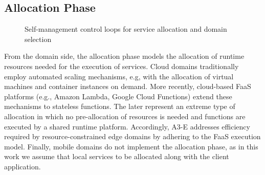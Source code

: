 \subsection{Allocation Phase}\label{sec:A3-E-allocation}

\begin{figure}[thbp]
	\centering
	\captionsetup[subfigure]{width=0.4\textwidth}	
	\null\hfill
	\captionsetup[subfigure]{width=0.4\textwidth}	
	\hfill
	\hfill\null
	\caption{Self-management control loops for service allocation and domain selection}\label{fig:allocation-loops}
\end{figure}

From the domain side, the allocation phase models the allocation of runtime resources needed for the execution of services. Cloud domains traditionally employ automated scaling mechanisms, e.g, with the allocation of virtual machines and container instances on demand. More recently, cloud-based FaaS platforms (e.g., Amazon Lambda, Google Cloud Functions) extend these mechanisms to stateless functions. The later represent an extreme type of allocation in which no pre-allocation of resources is needed and functions are executed by a shared runtime platform. Accordingly, A3-E addresses efficiency required by resource-constrained edge domains by adhering to the FaaS execution model.
Finally, mobile domains do not implement the allocation phase, as in this work we assume that local services to be allocated along with the client application.

